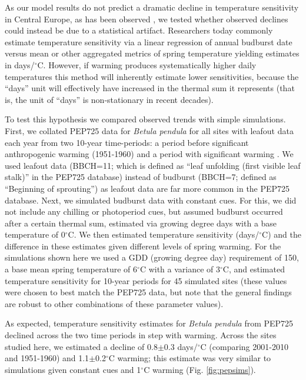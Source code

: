 \documentclass{article}
\begin{document}
As our model results do not predict a dramatic decline in temperature sensitivity in Central Europe, as has been observed \emph{\citep[e.g.,][]{fu2015}}, we tested whether observed declines could instead be due to a statistical artifact. Researchers today commonly estimate temperature sensitivity via a linear regression of annual budburst date versus mean or other aggregated metrics of spring temperature yielding estimates in days/$^{\circ}$C. However, if warming produces systematically higher daily temperatures this method will inherently estimate lower sensitivities, because the ``days'' unit will effectively have increased in the thermal sum it represents (that is, the unit of ``days'' is non-stationary in recent decades).
\par To test this hypothesis we compared observed trends with simple simulations. First, we collated PEP725 data \emph{\citep{Templ2018}} for \emph{Betula pendula} for all sites with leafout data each year from two 10-year time-periods: a period before significant anthropogenic warming (1951-1960) and a period with significant warming \emph{\citep[][]{IPCC:2014sm}}. We used leafout data (BBCH=11; which is defined as ``leaf unfolding (first visible leaf stalk)'' in the PEP725 database) instead of budburst (BBCH=7; defined as ``Beginning of sprouting'') as leafout data are far more common in the PEP725 database. Next, we simulated budburst data with constant cues. For this, we did not include any chilling or photoperiod cues, but assumed budburst occurred after a certain thermal sum, estimated via growing degree days with a base temperature of 0$^{\circ}$C. We then estimated temperature sensitivity (days/$^{\circ}$C) and the difference in these estimates given different levels of spring warming. For the simulations shown here we used a GDD (growing degree day) requirement of 150, a base mean spring temperature of 6$^{\circ}$C with a variance of 3$^{\circ}$C, and estimated temperature sensitivity for 10-year periods for 45 simulated sites (these values were chosen to best match the PEP725 data, but note that the general findings are robust to other combinations of these parameter values).

\par As expected, temperature sensitivity estimates for \emph{Betula pendula} from PEP725 declined across the two time periods in step with warming. Across the sites studied here, we estimated a decline of 0.8$\pm$0.3 days/$^{\circ}$C (comparing 2001-2010 and 1951-1960) and 1.1$\pm$0.2$^{\circ}$C warming; this estimate was very similar to simulations given constant cues and 1$^{\circ}$C warming (Fig. \ref{fig:pepsims}). 
\end{document}
